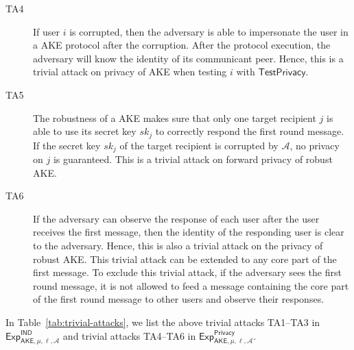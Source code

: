 \documentclass[a4paper,11pt]{article}
\begin{document}
\begin{sloppypar}
\begin{description}
    \item[TA4] If user $i$ is corrupted, then the adversary is able to impersonate the user in a AKE protocol after the corruption. After the protocol execution, the adversary will know the identity of its communicant peer. Hence, this is a trivial attack on privacy of AKE when testing $i$ with $\mathsf{TestPrivacy}$.
    \item[TA5] The robustness of a AKE makes sure that only one target recipient $j$ is able to use its secret key $sk_j$ to correctly respond the first round message. If the secret key $sk_j$ of the target recipient is corrupted by $\mathcal{A}$, no privacy on $j$ is guaranteed. This is a trivial attack on forward privacy of robust AKE.
    \item[TA6] If the adversary can observe the response of each user after the user receives the first message, then the identity of the responding user is clear to the adversary. Hence, this is also a trivial attack on the privacy of robust AKE. This trivial attack can be extended to any core part of the first message. To exclude this trivial attack, if the adversary sees the first round message, it is not allowed to feed a message containing the core part of the first round message to other users and observe their responses.
\end{description}

In Table~\ref{tab:trivial-attacks}, we list the above trivial attacks TA1--TA3 in $\mathsf{Exp}^{\mathsf{IND}}_{\mathsf{AKE},\mu,\ell,\mathcal{A}}$ and trivial attacks TA4--TA6 in $\mathsf{Exp}^{\mathsf{Privacy}}_{\mathsf{AKE},\mu,\ell,\mathcal{A}}$.


\end{sloppypar}
\end{document}
